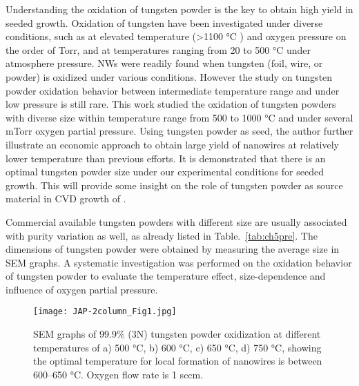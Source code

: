Understanding the oxidation of tungsten powder is the key to obtain high yield in seeded growth. Oxidation of tungsten have been investigated under diverse conditions, such as at elevated temperature (\textgreater 1100 \si{\degreeCelsius} ) and oxygen pressure on the order of Torr,\cite{Base1965} and at temperatures ranging from 20 to 500 \si{\degreeCelsius} under atmosphere pressure.\cite{Warren1996}  NWs were readily found when tungsten (foil, wire, or powder) is oxidized under various conditions.\cite{Zhu1999,Karuppanan2007,Hsieh2010} However the study on tungsten powder oxidation behavior between intermediate temperature range and under low pressure is still rare. This work studied the oxidation of tungsten powders with diverse size within temperature range from 500 to 1000 \si{\degreeCelsius} and under several mTorr oxygen partial pressure. Using tungsten powder as seed, the author further illustrate an economic approach to obtain large yield of  nanowires at relatively lower temperature than previous efforts. It is demonstrated that there is an optimal tungsten powder size under our experimental conditions for seeded growth. This will provide some insight on the role of tungsten powder as source material in CVD growth of .

Commercial available tungsten powders with different size are usually associated with purity variation as well, as already listed in Table.~\ref{tab:ch5pre}. The dimensions of tungsten powder were obtained by measuring the average size in SEM graphs. A systematic investigation was performed on the oxidation behavior of tungsten powder to evaluate the temperature effect, size-dependence and influence of oxygen partial pressure.
\begin{figure}[htb]
\centering
\texttt{[image: JAP-2column\_Fig1.jpg]}
\caption[W powder oxidation: temperature effect]{SEM graphs of 99.9\% (3N) tungsten powder oxidization at different temperatures of a) 500 \si{\degreeCelsius}, b) 600 \si{\degreeCelsius}, c) 650 \si{\degreeCelsius}, d) 750 \si{\degreeCelsius}, showing the optimal temperature for local formation of nanowires is between 600--650 \si{\degreeCelsius}. Oxygen flow rate is 1 sccm.}
\label{fig:pdtemp}
\end{figure}

